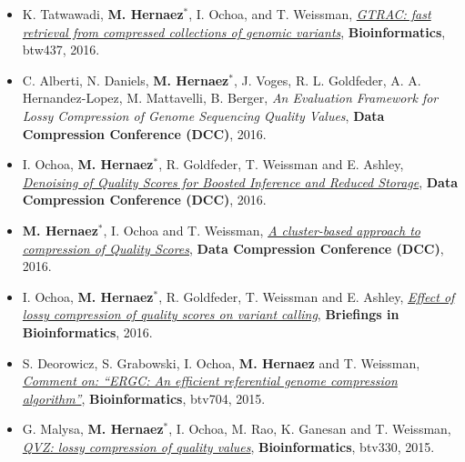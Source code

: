 \documentclass[11pt,a4paper,sans]{moderncv}        %
\begin{document}
\begin{itemize}
\item K. Tatwawadi, \textbf{M. Hernaez}$^\ast$, I. Ochoa, and T. Weissman, \href{http://idoia.ece.illinois.edu/papers/2016_gtrac_paper.pdf}{\textsl{GTRAC: fast retrieval from compressed collections of genomic variants}}, \textbf{Bioinformatics}, btw437, 2016.\\

\item C. Alberti, N. Daniels, \textbf{M. Hernaez}$^\ast$, J. Voges, R. L. Goldfeder, A. A. Hernandez-Lopez, M. Mattavelli, B. Berger, \emph{An Evaluation Framework for Lossy Compression of Genome Sequencing Quality Values},  {\textbf{ Data Compression Conference (DCC)}}, 2016. \\

\item I. Ochoa, \textbf{M. Hernaez}$^\ast$, R. Goldfeder, T. Weissman and E. Ashley, \href{http://web.stanford.edu/~iochoa/publishedPublications/2015_dcc_denoising.pdf}{\emph{ Denoising of Quality Scores for Boosted Inference and Reduced Storage}}, {\textbf{ Data Compression Conference (DCC)}}, 2016. \\

\item  \textbf{M. Hernaez}$^\ast$, I. Ochoa and T. Weissman, \href{http://web.stanford.edu/~iochoa/publishedPublications/2015_dcc_markovmixture.pdf}{\emph{ A cluster-based approach to compression of Quality Scores}}, {\textbf{ Data Compression Conference (DCC)}}, 2016. \\

\item I. Ochoa, \textbf{M. Hernaez}$^\ast$, R. Goldfeder, T. Weissman and E. Ashley, \href{http://web.stanford.edu/~iochoa/publishedPublications/2015_effectLossyCompression.pdf}{\textsl{ Effect of lossy compression of quality scores on variant calling}}, \textbf{ Briefings in Bioinformatics}, 2016.\\

\item S. Deorowicz, S. Grabowski, I. Ochoa, \textbf{M. Hernaez} and T. Weissman, \href{http://web.stanford.edu/~iochoa/publishedPublications/2015_ergc-comment.pdf}{\emph{ Comment on: ``ERGC: An efficient referential genome compression algorithm''}}, \textbf{Bioinformatics}, btv704, 2015.\\

\item G. Malysa, \textbf{M. Hernaez}$^\ast$, I. Ochoa, M. Rao, K. Ganesan and T. Weissman, \href{http://web.stanford.edu/~iochoa/publishedPublications/2015_qvz_paper.pdf}{\emph{ QVZ: lossy compression of quality values}}, \textbf{Bioinformatics}, btv330, 2015.\\


\end{itemize}
\end{document}
